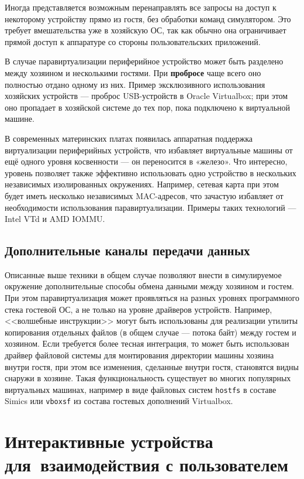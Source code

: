 Иногда представляется возможным перенаправлять все запросы на доступ к некоторому устройству прямо из гостя, без обработки команд симулятором. Это требует вмешательства уже в хозяйскую ОС, так как обычно она ограничивает  прямой доступ к аппаратуре со стороны пользовательских приложений.

В случае паравиртуализации периферийное устройство может быть разделено между хозяином и несколькими гостями. При \textbf{пробросе} чаще всего оно полностью отдано одному из них. Пример эксклюзивного использования хозяйских устройств --- проброс USB-устройств в Oracle Virtualbox; при этом оно пропадает в хозяйской системе до тех пор, пока подключено к виртуальной машине.

В современных материнских платах появилась аппаратная поддержка виртуализации периферийных устройств, что избавляет виртуальные машины от ещё одного уровня косвенности --- он переносится в «железо». Что интересно, уровень позволяет также эффективно использовать одно устройство в нескольких независимых изолированных окружениях. Например, сетевая карта при этом будет иметь несколько независимых MAC-адресов, что зачастую избавляет от необходимости использования паравиртуализации. Примеры таких технологий --- Intel VTd и AMD IOMMU.

\subsection{Дополнительные каналы передачи данных}

Описанные выше техники в общем случае позволяют внести в симулируемое окружение дополнительные способы обмена данными между хозяином и гостем. При этом паравиртуализация может проявляться на разных уровнях программного стека гостевой ОС, а не только на уровне драйверов устройств. Например, <<волшебные инструкции>> могут быть использованы для реализации утилиты копирования  отдельных файлов (в общем случае --- потока байт) между гостем и хозяином. Если требуется более тесная интеграция, то может быть использован драйвер файловой системы для монтирования директории машины хозяина внутри гостя, при этом все изменения, сделанные внутри гостя, становятся видны снаружи в хозяине. Такая функциональность существует во многих популярных виртуальных машинах, например в виде файловых систем \texttt{hostfs} в составе Simics или \texttt{vboxsf} из состава гостевых дополнений Virtualbox.

\section[Интерактивные устройства]{Интерактивные устройства для~взаимодействия с пользователем}

